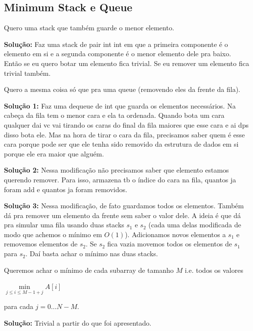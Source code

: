 \subsection{Minimum Stack e Queue}

 Quero uma stack que também guarde o menor elemento.

\textbf{Solução:} Faz uma stack de pair int int em que a primeira componente
é o elemento em si e a segunda componente é o menor elemento dele pra baixo. 
Então se eu quero botar um elemento fica trivial. Se eu remover um elemento
fica trivial também.

 Quero a mesma coisa só que pra uma queue (removendo
eles da frente da fila). 

\textbf{Solução 1:} Faz uma dequeue de int que guarda os elementos necessários.
Na cabeça da fila tem o menor cara e ela ta ordenada. Quando bota um cara qualquer
dai vc vai tirando os caras do final da fila maiores que esse cara e ai dps disso
bota ele. Mas na hora de tirar o cara da fila, precisamos saber quem é esse cara
porque pode ser que ele tenha sido removido da estrutura de dados em si porque 
ele era maior que alguém.


\textbf{Solução 2:} Nessa modificação não precisamos saber que elemento estamos
querendo remover. Para isso, armazena tb o índice do cara na fila, quantos ja foram
add e quantos ja foram removidos.


\textbf{Solução 3:} Nessa modificação, de fato guardamos todos os elementos. Também
dá pra remover um elemento da frente sem saber o valor dele. A ideia é que dá pra
simular uma fila usando duas stacks $s_1$ e $s_2$ (cada uma delas modificada de modo
que achemos o mínimo em $O(1)$). Adicionamos novos elementos a $s_1$ e removemos 
elementos de $s_2$. Se $s_2$ fica vazia movemos todos os elementos de $s_1$ para $s_2$.
Daí basta achar o mínimo nas duas stacks. 


 Queremos achar o mínimo de cada subarray de tamanho $M$ i.e. todos os valores

$\min\limits_{j \leq i \leq M-1+j} A[i]$

para cada $j=0 \dots N - M$.

\textbf{Solução:} Trivial a partir do que foi apresentado.